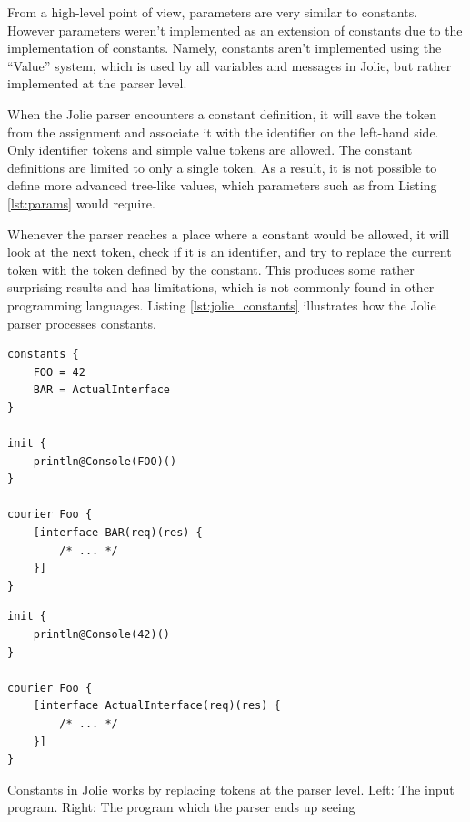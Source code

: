From a high-level point of view, parameters are very similar to constants.
However parameters weren't implemented as an extension of constants due to the
implementation of constants. Namely, constants aren't implemented using the
``Value'' system, which is used by all variables and messages in Jolie, but
rather implemented at the parser level.

When the Jolie parser encounters a constant definition, it will save the token
from the assignment and associate it with the identifier on the left-hand side.
Only identifier tokens and simple value tokens are allowed. The constant
definitions are limited to only a single token. As a result, it is not possible
to define more advanced tree-like values, which parameters such as
 from Listing \ref{lst:params} would require.

Whenever the parser reaches a place where a constant would be allowed, it will
look at the next token, check if it is an identifier, and try to replace the
current token with the token defined by the constant. This produces some rather
surprising results and has limitations, which is not commonly found in other
programming languages.  Listing \ref{lst:jolie_constants} illustrates how the
Jolie parser processes constants.

\begin{listing}[H]
\begin{multicols}{2}

\begin{verbatim}
constants {
    FOO = 42
    BAR = ActualInterface
}

init {
    println@Console(FOO)()
}

courier Foo {
    [interface BAR(req)(res) {
        /* ... */
    }]
}
\end{verbatim}

\columnbreak

\begin{verbatim}
init {
    println@Console(42)()
}

courier Foo {
    [interface ActualInterface(req)(res) {
        /* ... */
    }]
}
\end{verbatim}

\end{multicols}

\caption{Constants in Jolie works by replacing tokens at the parser level.
    Left: The input program. Right: The program which the parser ends up
        seeing}

\label{lst:jolie_constants}

\end{listing}

